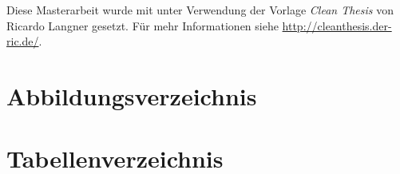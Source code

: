 
{%
\renewcommand{\bibfont}{\normalfont\small}
\setlength{\biblabelsep}{0pt}
\setlength{\bibitemsep}{0.5\baselineskip plus 0.5\baselineskip}
\printbibliography
}

\vfill

Diese Masterarbeit wurde mit \LaTeXe unter Verwendung der Vorlage \textit{Clean Thesis} von Ricardo Langner gesetzt.
Für mehr Informationen siehe \url{http://cleanthesis.der-ric.de/}.

\cleardoublepage

\chapter*{Abbildungsverzeichnis}
\renewcommand\listfigurename{}
\vspace*{-2.35cm}
\listoffigures
\cleardoublepage

\chapter*{Tabellenverzeichnis}
\renewcommand\listtablename{}
\vspace*{-2.35cm}
\listoftables
\cleardoublepage


